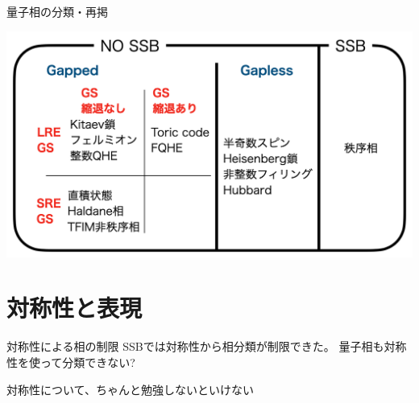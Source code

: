 \documentclass[dvipdfm]{beamer}
\begin{document}
\begin{frame}{量子相の分類・再掲}
    \begin{center}
        \includegraphics[width=\linewidth]{phase-diag.png}
    \end{center}
\end{frame}


\section{対称性と表現}

\begin{frame}{対称性による相の制限}
    SSBでは対称性から相分類が制限できた。
    量子相も対称性を使って分類できない?

    対称性について、ちゃんと勉強しないといけない
\end{frame}
\end{document}
